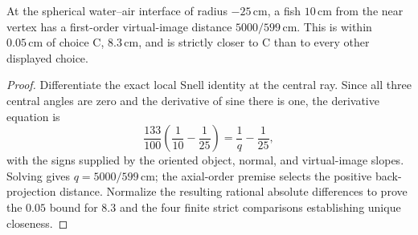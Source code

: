 \begin{theorem}
\label{thm:physics:phyx_mini_0055:target}
At the spherical water--air interface of radius \(-25\,\mathrm{cm}\), a fish
\(10\,\mathrm{cm}\) from the near vertex has a first-order virtual-image
distance \(5000/599\,\mathrm{cm}\).  This is within \(0.05\,\mathrm{cm}\) of
choice C, \(8.3\,\mathrm{cm}\), and is strictly closer to C than to every
other displayed choice.
\end{theorem}
\begin{proof}
Differentiate the exact local Snell identity at the central ray.  Since all
three central angles are zero and the derivative of sine there is one, the
derivative equation is
\[
 \frac{133}{100}\left(\frac1{10}-\frac1{25}\right)
   =\frac1q-\frac1{25},
\]
with the signs supplied by the oriented object, normal, and virtual-image
slopes.  Solving gives \(q=5000/599\,\mathrm{cm}\); the axial-order premise
selects the positive back-projection distance.  Normalize the resulting
rational absolute differences to prove the \(0.05\) bound for \(8.3\) and
the four finite strict comparisons establishing unique closeness.
\end{proof}

